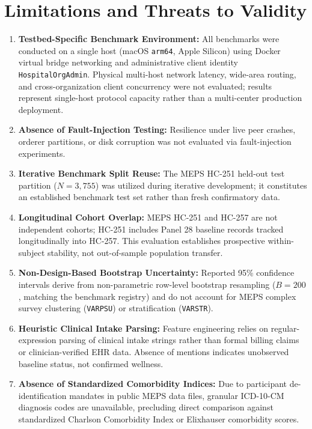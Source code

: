 \documentclass[runningheads]{llncs}
\begin{document}
\section{Limitations and Threats to Validity}
\begin{enumerate}
    \item \textbf{Testbed-Specific Benchmark Environment:} All benchmarks were conducted on a single host (macOS \texttt{arm64}, Apple Silicon) using Docker virtual bridge networking and administrative client identity \texttt{HospitalOrgAdmin}. Physical multi-host network latency, wide-area routing, and cross-organization client concurrency were not evaluated; results represent single-host protocol capacity rather than a multi-center production deployment.
    \item \textbf{Absence of Fault-Injection Testing:} Resilience under live peer crashes, orderer partitions, or disk corruption was not evaluated via fault-injection experiments.
    \item \textbf{Iterative Benchmark Split Reuse:} The MEPS HC-251 held-out test partition ($N=3,755$) was utilized during iterative development; it constitutes an established benchmark test set rather than fresh confirmatory data.
    \item \textbf{Longitudinal Cohort Overlap:} MEPS HC-251 and HC-257 are not independent cohorts; HC-251 includes Panel 28 baseline records tracked longitudinally into HC-257. This evaluation establishes prospective within-subject stability, not out-of-sample population transfer.
    \item \textbf{Non-Design-Based Bootstrap Uncertainty:} Reported 95\% confidence intervals derive from non-parametric row-level bootstrap resampling ($B=200$, matching the benchmark registry) and do not account for MEPS complex survey clustering (\texttt{VARPSU}) or stratification (\texttt{VARSTR}).
    \item \textbf{Heuristic Clinical Intake Parsing:} Feature engineering relies on regular-expression parsing of clinical intake strings rather than formal billing claims or clinician-verified EHR data. Absence of mentions indicates unobserved baseline status, not confirmed wellness.
    \item \textbf{Absence of Standardized Comorbidity Indices:} Due to participant de-identification mandates in public MEPS data files, granular ICD-10-CM diagnosis codes are unavailable, precluding direct comparison against standardized Charlson Comorbidity Index or Elixhauser comorbidity scores.

\end{enumerate}
\end{document}
